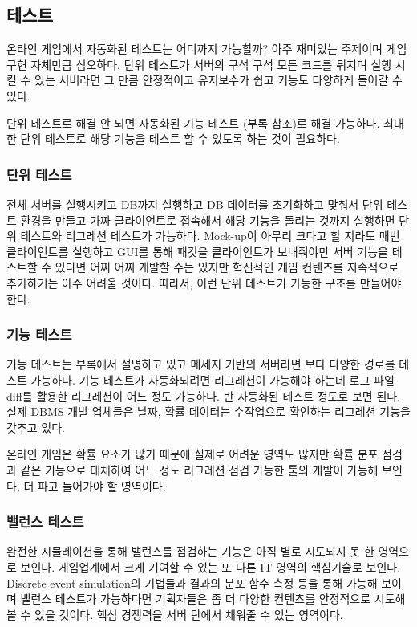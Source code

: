 \documentclass[chapter,kosection, 10.5pt, romanfixed, a4paper]{oblivoir}
\begin{document}
\subsection{테스트}

온라인 게임에서 자동화된 테스트는 어디까지 가능할까? 아주 재미있는 주제이며 게임 구현 자체만큼
심오하다. 단위 테스트가 서버의 구석 구석 모든 코드를 뒤지며 실행 시킬 수 있는 서버라면 
그 만큼 안정적이고 유지보수가 쉽고 기능도 다양하게 들어갈 수 있다. 

단위 테스트로 해결 안 되면 자동화된 기능 테스트 (부록 참조)로 해결 가능하다. 최대한
단위 테스트로 해당 기능을 테스트 할 수 있도록 하는 것이 필요하다. 

\subsubsection{단위 테스트}

전체 서버를 실행시키고 DB까지 실행하고 DB 데이터를 초기화하고 맞춰서 단위 테스트 환경을 만들고 
가짜 클라이언트로 접속해서 해당 기능을 돌리는 것까지 실행하면 단위 테스트와 리그레션 테스트가 
가능하다. Mock-up이 아무리 크다고 할 지라도 매번 클라이언트를 실행하고 GUI를 통해 패킷을 클라이언트가 
보내줘야만 서버 기능을 테스트할 수 있다면 어찌 어찌 개발할 수는 있지만 혁신적인 게임 컨텐츠를 
지속적으로 추가하기는 아주 어려울 것이다. 따라서, 이런 단위 테스트가 가능한 구조를 만들어야 한다. 

\subsubsection{기능 테스트}

기능 테스트는 부록에서 설명하고 있고 메세지 기반의 서버라면 보다 다양한 경로를 테스트 가능하다. 
기능 테스트가 자동화되려면 리그레션이 가능해야 하는데 로그 파일 diff를 활용한 리그레션이 어느 정도 
가능하다. 반 자동화된 테스트 정도로 보면 된다. 실제 DBMS 개발 업체들은 날짜, 확률 데이터는 수작업으로 
확인하는 리그레션 기능을 갖추고 있다. 

온라인 게임은 확률 요소가 많기 때문에 실제로 어려운 영역도 많지만 확률 분포 점검과 같은 기능으로 
대체하여 어느 정도 리그레션 점검 가능한 툴의 개발이 가능해 보인다. 더 파고 들어가야 할 영역이다. 

\subsubsection{밸런스 테스트}

완전한 시뮬레이션을 통해 밸런스를 점검하는 기능은 아직 별로 시도되지 못 한 영역으로 보인다. 게임업계에서
크게 기여할 수 있는 또 다른 IT 영역의 핵심기술로 보인다. Discrete event simulation의 기법들과 결과의 
분포 함수 측정 등을 통해 가능해 보이며 밸런스 테스트가 가능하다면 기획자들은 좀 더 다양한 컨텐츠를 
안정적으로 시도해 볼 수 있을 것이다. 핵심 경쟁력을 서버 단에서 채워줄 수 있는 영역이다. 
\end{document}
